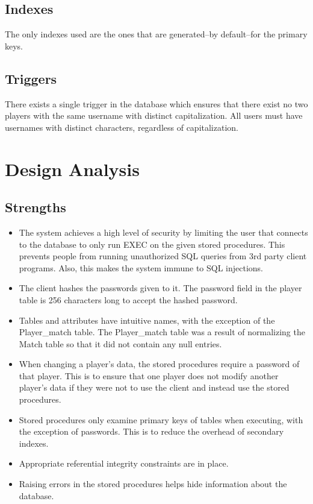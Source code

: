 \documentclass{article}
\begin{document}
\subsection{Indexes}
The only indexes used are the ones that are generated--by default--for the primary keys.
\subsection{Triggers}
There exists a single trigger in the database which ensures that there exist no two players with the same username with distinct capitalization.  All users must have usernames with distinct characters, regardless of capitalization.

\section{Design Analysis}
\subsection{Strengths}
\begin{itemize}
\item The system achieves a high level of security by limiting the user that connects to the database to only run EXEC on the given stored procedures. This prevents people from running unauthorized SQL queries from 3rd party client programs. Also, this makes the system immune to SQL injections.
\item The client hashes the passwords given to it. The password field in the player table is 256 characters long to accept the hashed password.
\item Tables and attributes have intuitive names, with the exception of the Player\_match table. The Player\_match table was a result of normalizing the Match table so that it did not contain any null entries.
\item When changing a player's data, the stored procedures require a password of that player. This is to ensure that one player does not modify another player's data if they were not to use the client and instead use the stored procedures.
\item Stored procedures only examine primary keys of tables when executing, with the exception of passwords. This is to reduce the overhead of secondary indexes.
\item Appropriate referential integrity constraints are in place.
\item Raising errors in the stored procedures helps hide information about the database.
\end{itemize}
\end{document}

